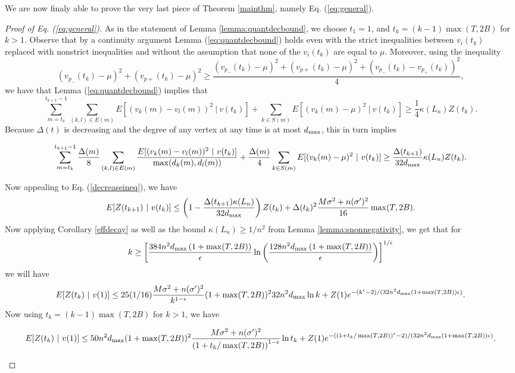 \documentclass[final]{siamltex}
\begin{document}
 \smallskip
 
{{{We are now finaly able to prove the very last piece of Theorem \ref{mainthm}, namely 
Eq. (\ref{eq:general}).}}}

\bigskip

\begin{proof}[Proof of Eq. (\ref{eq:general})] As in the statement of Lemma \ref{lemma:quantdecbound}, we choose $t_1=1$, and 
$t_k = (k-1) \max(T,2B)$ for $k > 1$. {{{Observe that by a continuity argument Lemma (\ref{eq:quantdecbound}) holds even with the strict inequalities between $v_i(t_k)$ replaced with nonstrict inequalities and without the assumption that none of the $v_i(t_k)$ are {{{equal to $\mu$}}}. Moreover, using the inequality \[ (v_{p_-}(t_k) - \mu)^2 + (v_{p+}(t_k) - \mu)^2 \geq \frac{(v_{p_-}(t_k) - \mu)^2 + (v_{p+}(t_k) - \mu)^2 + (v_{p_-}(t_k) - v_{p_+}(t_k))^2}{4}, \]  we have that Lemma (\ref{eq:quantdecbound}) implies that}}}  \[ \sum_{m=t_k}^{t_{k+1}-1} \sum_{(k,l) \in E(m)} E[ (v_k(m)-v_l(m))^2 ~|~ v(t_k)] +   \sum_{k \in S(m)} E[ (v_k(m) - \mu)^2 ~|~ v(t_k)]  \geq  \frac{1}{4} \kappa(L_n) Z(t_k).\] Because $\Delta(t)$ is decreasing and the degree of any vertex at any time is at most $d_{\rm max}$, this in turn implies \begin{footnotesize}
  \[ \sum_{m=t_k}^{t_{k+1}-1} \frac{\Delta(m)}{8} \sum_{(k,l) \in E(m)} \frac{E[ (v_k(m)-v_l(m))^2 ~|~ v(t_k)]}{\max (d_k(m), d_l(m))}  + \frac{\Delta(m)}{4  }  \sum_{k \in S(m)} E[ (v_k(m) - \mu)^2 ~|~ v(t_k)]  \geq \frac{\Delta(t_{k+1})}{32 d_{\rm max}} \kappa(L_n) Z(t_k).\] \end{footnotesize}
Now appealing to Eq. (\ref{decreaseineq}), we have
\[ E[Z(t_{k+1}) ~|~ v(t_k) ] \leq \left(1 - \frac{\Delta(t_{k+1}) \kappa(L_n)}{32 d_{\rm max} } \right) Z(t_k) +  \Delta(t_k)^2 \frac{{{{ M \sigma^2 + n  (\sigma')^2}}}}{16} \max(T,2B). \] 
Now applying Corollary \ref{effdecay} as well as the bound $\kappa(L_n) \geq 1/n^2$ from Lemma \ref{lemma:snonnegativity}, we get that for 
\begin{equation} \label{finalkbound} k \geq  \left[ \frac{384 n^2 d_{\rm max} \left( 1 + \max(T,2B) \right) }{\epsilon} \ln \left( \frac{128 n^2 d_{\rm max} \left( 1 + \max(T,2B) \right) }{\epsilon} \right) \right]^{1/\epsilon} \end{equation} we will have 
\[ E[ Z(t_k) ~|~ v(1) ] \leq 25(1/16)  \frac{ M \sigma^2 + n  (\sigma')^2}{k^{1 - \epsilon}} (1+\max(T,2B))^2  32 n^2 d_{\rm max}\ln k + Z(1) e^{-(k^\epsilon - 2)/(32n^2 d_{\rm max}  \left( 1 + \max(T,2B) \right) \epsilon)}. \] Now using $t_k = (k-1) \max(T,2B) $ for $k >1$, we have \begin{small}
\[ E[ Z(t_k) ~|~ v(1) ] \leq 50 n^2 d_{\rm max} (1+\max(T,2B))^2 \frac{ M \sigma^2 + n   (\sigma')^2}{\left( 1 + t_k/\max(T,2B) \right)^{1 - \epsilon}} \ln t_k + Z(1) e^{-( \left(1 + t_k/\max(T,2B)\right)^\epsilon - 2)/(32n^2 d_{\rm max}  \left( 1 + \max(T,2B) \right) \epsilon)}. \] \end{small}


\end{proof}
\end{document}
